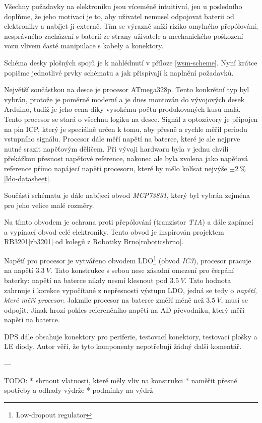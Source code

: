 Všechny požadavky na elektroniku jsou víceméně intuitivní, jen u posledního
doplňme, že jeho motivací je to, aby uživatel nemusel odpojovat baterii od
elektroniky a nabíjet jí externě. Tím se výrazně sníží riziko omylného
přepólování, nesprávného zacházení s baterií ze strany uživatele a mechanického
poškození vozu vlivem časté manipulace s kabely a konektory.

Schéma desky plošných spojů je k nahlédnutí v příloze \ref{wsm-scheme}. Nyní
krátce popišme jednotlivé prvky schématu a jak přispívají k naplnění požadavků.

Největší součástkou na desce je procesor ATmega328p. Tento konkrétní typ byl
vybrán, protože je poměrně moderní a je dnes montován do vývojových desek
Arduino, tudíž je jeho cena díky vysokému počtu produkovaných kusů malá.
Tento procesor se stará o všechnu logiku na desce. Signál z optozávory je
připojen na pin ICP, který je speciálně určen k tomu, aby přesně a rychle měřil
periodu vstupního signálu. Procesor dále měří napětí na baterce, které je ale
nejprve nutné srazit napěťovým děličem. Při vývoji hardwaru byla v jednu chvíli
překážkou přesnost napěťové reference, nakonec ale byla zvolena jako napěťová
reference přímo napájecí napětí procesoru, které by mělo kolísat nejvýše $\pm 2\ \%$
\ref{ldo-datasheet}.

Součástí schématu je dále nabíjecí obvod \textit{MCP73831}, který byl vybrán
zejména pro jeho velice malé rozměry.

Na tímto obvodem je ochrana proti přepólování (tranzistor \textit{T1A}) a dále
zapínací a vypínací obvod celé elektroniky. Tento obvod je inspirován projektem
RB3201\ref{rb3201} od kolegů z Robotiky Brno\ref{roboticsbrno}.

Napětí pro procesor je vytvářeno obvodem LDO\footnote{Low-dropout regulator}
(obvod \textit{IC3}), procesor pracuje na napětí $3.3\ V$. Tato konstrukce
s sebou nese zásadní omezení pro čerpání baterky: napětí na baterce nikdy nesmí
klesnout pod $3.5\ V$. Tato hodnota zahrnuje i korekce vypočítané z nepřesnosti
výstupu LDO, jedná se tedy o \textit{napětí, které měří procesor}. Jakmile
procesor na baterce změří méně než $3.5\ V$, musí se odpojit. Jinak hrozí
pokles referenčního napětí na AD převodníku, který měří napětí na baterce.

DPS dále obsahuje konektory pro periferie, testovací konektory, testovací
plošky a LE diody. Autor věří, že tyto komponenty nepotřebují žádný další
komentář.

---

TODO:
 * shrnout vlatnosti, které měly vliv na konstrukci
 * naměřit přesné spotřeby a odhady výdrže
 * podmínky na výdrž
